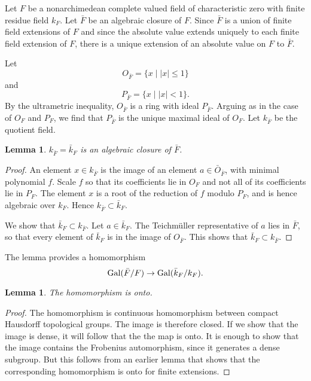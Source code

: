 \documentclass{amsart}
\newtheorem{lemma}[equation]{Lemma}
\def\abs#1{{|#1|}}
\begin{document}
Let $F$ be a nonarchimedean
complete valued field of characteristic zero with finite residue field $k_F$.
Let $\bar{F}$ be an algebraic closure of $F$.  Since $\bar{F}$ is a union of
finite field extensions of $F$ and since the absolute value extends uniquely to
each finite field extension of $F$, there is a unique extension of an absolute
value on $F$ to $\bar{F}$.

Let 
\[
O_{\bar F} = \{x \mid \abs{x}\le 1\}
\]
and
\[
P_{\bar F} = \{x \mid \abs{x} < 1\}.
\]
By the ultrametric inequality, $O_{\bar F}$ is a ring with ideal $P_{\bar F}$.
Arguing as in the case of $O_F$ and $P_F$, we find that $P_{\bar F}$ is the unique
maximal ideal of $O_F$.  Let $k_{\bar F}$ be the quotient field.

\begin{lemma}
$k_{\bar F} = \bar{k}_F$
is an algebraic closure of $\bar{F}$.
\end{lemma}

\begin{proof} An element $x\in k_{\bar F}$ is the image of an element
  $a\in\bar O_{\bar F}$, with minimal polynomial $f$.  Scale $f$ so
  that its coefficients lie in $O_{F}$ and not all of its coefficients
  lie in $P_F$.  The element $x$ is a root of the reduction of $f$
  modulo $P_F$, and is hence algebraic over $k_F$.  Hence $ k_{\bar
    F}\subset \bar{k}_F$.

We show that $\bar{k}_F\subset k_{\bar F}$.  Let $a\in \bar{k}_F$.
The Teichm\"uller representative of $a$ lies in $\bar F$, so that every
element of $\bar{k}_F$ is in the image of $O_{\bar F}$.  This shows
that $\bar{k}_F\subset k_{\bar F}$.
\end{proof}

The lemma provides a homomorphism
\[
{\operatorname{Gal}}(\bar F/F)\to {\operatorname{Gal}}(\bar{k}_{F}/k_F).
\]

\begin{lemma} The homomorphism is onto.
\end{lemma}

\begin{proof} The homomorphism is continuous homomorphism between compact
Hausdorff topological groups.  The image is therefore closed.  If we show
that the image is dense, it will follow that the the map is onto.  It is
enough to show that the image contains the Frobenius automorphism, since
it generates a dense subgroup. But this follows from an earlier lemma
that shows that the corresponding homomorphism is onto for finite extensions.
\end{proof}
\end{document}

